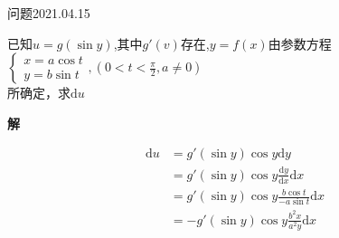 \begin{mybox}{问题2021.04.15}
	
	\qquad 已知$u=g(\sin y)$,其中$g'(v)$存在,$y=f(x)$由参数方程\\
	$\begin{cases}
		x=a\cos t\\
		y=b\sin t
	\end{cases},(0<t<\frac{\pi}{2},a\neq 0)$\\
所确定，求$\mathrm{d}u$
\end{mybox}
\noindent
\textbf{解}

\begin{align*}
	\mathrm{d}u&=g'(\sin y)\cos y \mathrm{d}y\\
	  &=g'(\sin y)\cos y \frac{\mathrm{d}y}{\mathrm{d}x} \mathrm{d}x\\
	  &=g'(\sin y)\cos y \frac{b\cos t}{-a\sin t} \mathrm{d}x\\
	  &=-g'(\sin y)\cos y \frac{b^2 x}{a^2 y} \mathrm{d}x
\end{align*}